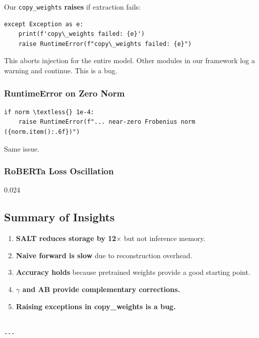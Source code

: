 Our \texttt{copy\_weights} \textbf{raises} if extraction fails:

\begin{lstlisting}
except Exception as e:
    print(f'copy\_weights failed: {e}')
    raise RuntimeError(f"copy\_weights failed: {e}")
\end{lstlisting}

This aborts injection for the entire model. Other modules in our framework 
log a warning and continue. This is a bug.

\subsubsection{RuntimeError on Zero Norm}

\begin{lstlisting}
if norm \textless{} 1e-4:
    raise RuntimeError(f"... near-zero Frobenius norm ({norm.item():.6f})")
\end{lstlisting}

Same issue.

\subsubsection{RoBERTa Loss Oscillation}

0.024

\subsection{Summary of Insights}

\begin{enumerate}
\item \textbf{SALT reduces storage by 12$\times$} but not inference memory.
\item \textbf{Naive forward is slow} due to reconstruction overhead.
\item \textbf{Accuracy holds} because pretrained weights provide a good starting point.
\item \textbf{$\gamma$ and AB provide complementary corrections.}
\item \textbf{Raising exceptions in copy\_weights is a bug.}
\end{enumerate}
\begin{lstlisting}

---
\end{lstlisting}
